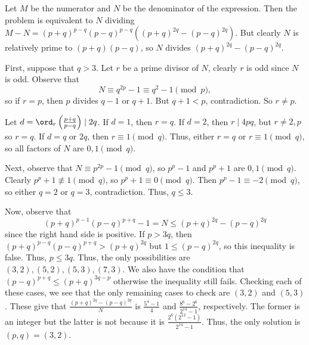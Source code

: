 Let $M$ be the numerator and $N$ be the denominator of the expression. Then the problem is equivalent to $N$ dividing $M-N=\left(p+q\right)^{p-q}\left(p-q\right)^{p-q}\left(\left(p+q\right)^{2q}-\left(p-q\right)^{2q}\right)$. But clearly $N$ is relatively prime to $\left(p+q\right)\left(p-q\right)$, so $N$ divides $\left(p+q\right)^{2q}-\left(p-q\right)^{2q}$.

First, suppose that $q>3$. Let $r$ be a prime divisor of $N$, clearly $r$ is odd since $N$ is odd. Observe that \[N\equiv q^{2p}-1\equiv q^2-1\pmod p,\] so if $r=p$, then $p$ divides $q-1$ or $q+1$. But $q+1<p$, contradiction. So $r\neq p$.

Let $d=\ord_r\left(\frac{p+q}{p-q}\right)\mid 2q$. If $d=1$, then $r=q$. If $d=2$, then $r\mid4pq$, but $r\neq2,p$ so $r=q$. If $d=q$ or $2q$, then $r\equiv1\pmod q$. Thus, either $r=q$ or $r\equiv1\pmod q$, so all factors of $N$ are $0,1\pmod q$.

Next, observe that $N\equiv p^{2p}-1\pmod q$, so $p^p-1$ and $p^p+1$ are $0,1\pmod q$. Clearly $p^p+1\not\equiv1\pmod q$, so $p^p+1\equiv0\pmod q$. Then $p^p-1\equiv-2\pmod q$, so either $q=2$ or $q=3$, contradiction. Thus, $q\leq3$.

Now, observe that \[\left(p+q\right)^{p-1}\left(p-q\right)^{p+q}-1=N\leq\left(p+q\right)^{2q}-\left(p-q\right)^{2q}\] since the right hand side is positive. If $p>3q$, then $\left(p+q\right)^{p-q}\left(p-q\right)^{p+q}>\left(p+q\right)^{2q}$ but $1\leq\left(p-q\right)^{2q}$, so this inequality is false. Thus, $p\leq3q$. Thus, the only possibilities are $\left(3,2\right),\left(5,2\right),\left(5,3\right),\left(7,3\right)$. We also have the condition that $\left(p-q\right)^{p+q}\leq\left(p+q\right)^{3q-p}$ otherwise the inequality still fails. Checking each of these cases, we see that the only remaining cases to check are $\left(3,2\right)$ and $\left(5,3\right)$. These give that $\frac{\left(p+q\right)^{2q}-\left(p-q\right)^{2q}}{N}$ is $\frac{5^4-1}{4}$ and $\frac{8^6-2^6}{2^{14}-1}$, respectively. The former is an integer but the latter is not because it is $\frac{2^6\left(2^{12}-1\right)}{2^{14}-1}$. Thus, the only solution is $\left(p,q\right)=\boxed{\left(3,2\right)}$.